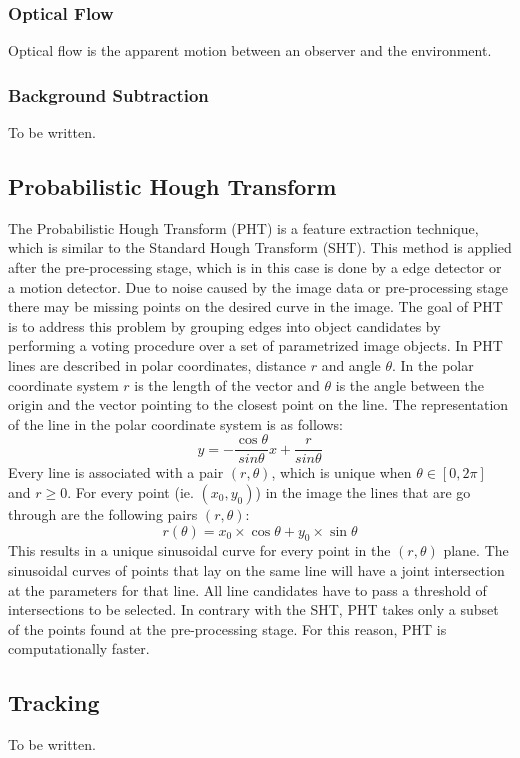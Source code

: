\documentclass[a4paper]{article}
\begin{document}
\subsubsection{Optical Flow}
\label{opticalflow}
Optical flow is the apparent motion between an observer and the environment. 
\subsubsection{Background Subtraction}
To be written.
\subsection{Probabilistic Hough Transform}
The Probabilistic Hough Transform (PHT) \cite{Kiryati1991} is a feature extraction technique, which is similar to the Standard Hough Transform (SHT). This method is applied after the pre-processing stage, which is in this case is done by a edge detector or a motion detector. Due to noise caused by the image data or pre-processing stage there may be missing points on the desired curve in the image. The goal of PHT is to address this problem by grouping edges into object candidates by performing a voting procedure over a set of parametrized image objects. In PHT lines are described in polar coordinates, distance $r$ and angle $\theta$. In the polar coordinate system $r$ is the length of the vector and $\theta$ is the angle between the origin and the vector pointing to the closest point on the line. The representation of the line in the polar coordinate system is as follows:
\begin{equation}
y = -\frac{\cos \theta}{sin \theta} x + \frac{r}{sin \theta}
\end{equation}
Every line is associated with a pair $(r,\theta)$, which is unique when $\theta \in [0, 2\pi]$ and $r \geq 0$. For every point (ie. $(x_0, y_0)$) in the image the lines that are go through are the following pairs $(r, \theta)$:
\begin{equation}
r(\theta) = x_0 \times \cos \theta + y_0 \times \sin \theta
\end{equation}
This results in a unique sinusoidal curve for every point in the $(r, \theta)$ plane. The sinusoidal curves of points that lay on the same line will have a joint intersection at the parameters for that line. All line candidates have to pass a threshold of intersections to be selected. In contrary with the SHT, PHT takes only a subset of the points found at the pre-processing stage. For this reason, PHT is computationally faster.
\subsection{Tracking}
To be written.
\end{document}
